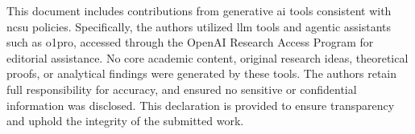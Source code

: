 \begin{aideclaration}
This document includes contributions from generative \acrshort{ai} tools consistent with \acrshort{ncsu} policies. Specifically, the authors utilized \acrfull{llm} tools and agentic assistants such as \acrfull{o1pro}, accessed through the OpenAI Research Access Program for editorial assistance. No core academic content, original research ideas, theoretical proofs, or analytical findings were generated by these tools. The authors retain full responsibility for accuracy, and ensured no sensitive or confidential information was disclosed. This declaration is provided to ensure transparency and uphold the integrity of the submitted work.
\end{aideclaration}